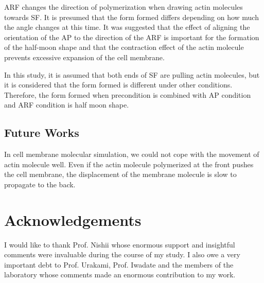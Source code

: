 \documentclass[a4paper,12pt, oneside]{book}
\begin{document}
ARF changes the direction of polymerization when drawing actin molecules towards SF.
It is presumed that the form formed differs depending on how much the angle changes at this time.
It was suggested that the effect of aligning the orientation of the AP to the direction of the ARF is important for the formation of the half-moon shape and that the contraction effect of the actin molecule prevents excessive expansion of the cell membrane.

In this study, it is assumed that both ends of SF are pulling actin molecules, but it is considered that the form formed is different under other conditions.
Therefore, the form formed when precondition is combined with AP condition and ARF condition is half moon shape.

\section{Future Works}
In cell membrane molecular simulation, we could not cope with the movement of actin molecule well. Even if the actin molecule polymerized at the front pushes the cell membrane, the displacement of the membrane molecule is slow to propagate to the back.
\chapter*{Acknowledgements}
I would like to thank Prof. Nishii whose enormous support and insightful comments were invaluable during the course of my study. I also owe a very important debt to Prof. Urakami, Prof. Iwadate and the members of the laboratory whose comments made an enormous contribution to my work. 




\end{document}
